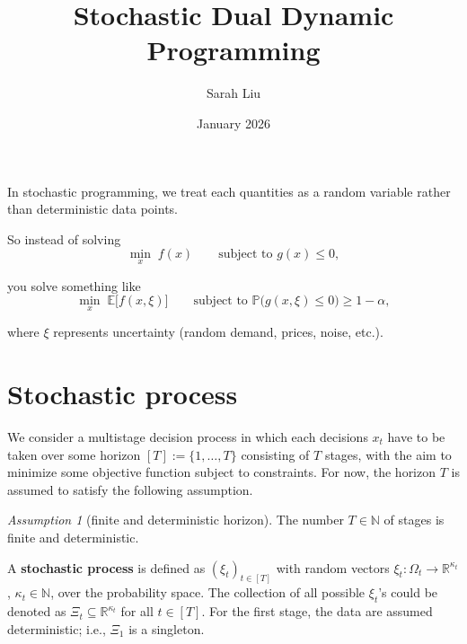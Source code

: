 \documentclass{article}
\title{Stochastic Dual Dynamic Programming}
\author{Sarah Liu}
\date{January 2026}
\theoremstyle{remark}
\newtheorem{assumption}{Assumption}
\begin{document}
\maketitle


In stochastic programming, we treat each quantities as a random variable rather than deterministic data points.

So instead of solving
\[
\min_{x} \; f(x) \qquad \text{subject to } g(x) \le 0,
\]

you solve something like
\[
\min_{x} \; \mathbb{E}\big[ f(x,\xi) \big]
\qquad \text{subject to } 
\mathbb{P}\big( g(x,\xi) \le 0 \big) \ge 1 - \alpha,
\]

where $\xi$ represents uncertainty (random demand, prices, noise, etc.).

\section{Stochastic process}
We consider a multistage decision process in which each decisions $x_t$ have to be taken over some horizon $[T] := \{ 1, \dots, T\}$ consisting of $T$ stages, with the aim to minimize some objective function subject to constraints. For now, the horizon $T$ is assumed to
satisfy the following assumption.

\begin{assumption}[finite and deterministic horizon]
The number $T\in \mathbb{N}$ of stages is
finite and deterministic.
\end{assumption}

A \textbf{stochastic process} is defined as $(\xi_t)_{t \in [T]}$ with random vectors $\xi_t : \Omega_t \to \mathbb{R}^{\kappa_t}$, 
$\kappa_t \in \mathbb{N}$, over the probability space. 
The collection of all possible $\xi_t$'s could be denoted as $\Xi_t \subseteq \mathbb{R}^{\kappa_t}$ for all $t \in [T]$. For the first stage, the data are assumed deterministic; i.e., $\Xi_1$ is a singleton. 
\end{document}
